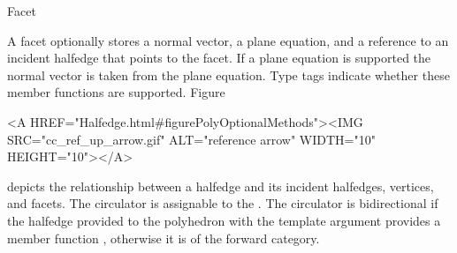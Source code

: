 
\ccRefPageBegin



\begin{ccRefClass}{Facet}

\ccDefinition
  
A facet optionally stores a normal vector, a plane equation, and a
reference to an incident halfedge that points to the facet.  If a
plane equation is supported the normal vector is taken from the plane
equation. Type tags indicate whether these member functions are
supported.  Figure~\begin{ccHtmlOnly}
  <A HREF="Halfedge.html#figurePolyOptionalMethods"><IMG
  SRC="cc_ref_up_arrow.gif" ALT="reference arrow" WIDTH="10" HEIGHT="10"></A>
\end{ccHtmlOnly}
depicts the relationship between a halfedge and its incident
halfedges, vertices, and facets. The circulator is assignable to the
. The circulator is bidirectional if the
halfedge provided to the polyhedron with the  template
argument provides a member function , otherwise it is
of the forward category.



\ccTypes
{}
\ccThreeToTwo

\ccGlue
{}
\ccGlue
{}
\ccGlue
{}

\ccGlue
{}
\ccGlue
{}
\ccGlue
{}


\end{ccRefClass}
